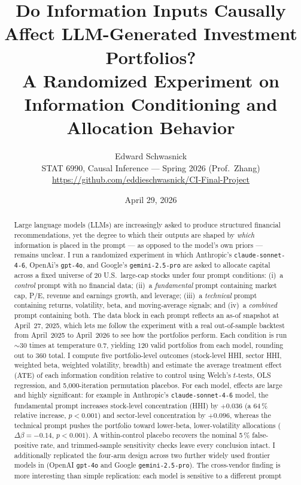 \documentclass[11pt]{article}
\title{\textbf{Do Information Inputs Causally Affect LLM-Generated Investment Portfolios? \\[0.25em]
\large A Randomized Experiment on Information Conditioning and Allocation Behavior}}
\author{Edward Schwasnick \\
\small STAT 6990, Causal Inference --- Spring 2026 (Prof.\ Zhang) \\
\small \url{https://github.com/eddieschwasnick/CI-Final-Project}}
\date{April 29, 2026}
\begin{document}
\maketitle

\begin{abstract}
Large language models (LLMs) are increasingly asked to produce structured
financial recommendations, yet the degree to which their outputs are shaped by
\emph{which} information is placed in the prompt --- as opposed to the
model's own priors --- remains unclear. I run a randomized experiment in which
Anthropic's \texttt{claude-sonnet-4-6}, OpenAi's \texttt{gpt-4o}, and Google's
\texttt{gemini-2.5-pro} are asked to allocate capital across a
fixed universe of 20 U.S.\ large-cap stocks under four prompt conditions:
(i)~a \emph{control} prompt with no financial data; (ii)~a \emph{fundamental}
prompt containing market cap, P/E, revenue and earnings growth, and leverage;
(iii)~a \emph{technical} prompt containing returns, volatility, beta, and
moving-average signals; and (iv)~a \emph{combined} prompt containing both.
The data block in each prompt reflects an as-of snapshot at April~27, 2025,
which lets me follow the experiment with a real out-of-sample backtest from
April~2025 to April~2026 to see how the portfolios perform. Each condition is run $\sim$30 times at temperature
0.7, yielding 120 valid portfolios from each model, rounding out to 360 total. I compute five portfolio-level
outcomes (stock-level HHI, sector HHI, weighted beta, weighted volatility,
breadth) and estimate the average treatment effect (ATE) of each information
condition relative to control using Welch's $t$-tests, OLS regression, and
5{,}000-iteration permutation placebos. For each model, effects are large and highly
significant: for example in Anthropic's \texttt{claude-sonnet-4-6} model, the fundamental prompt increases stock-level concentration (HHI)
by $+0.036$ (a 64\,\% relative increase, $p<0.001$) and sector-level
concentration by $+0.096$, whereas the technical prompt pushes the
portfolio toward lower-beta, lower-volatility allocations ($\Delta\beta
= -0.14$, $p<0.001$). A within-control placebo recovers the nominal 5\,\%
false-positive rate, and trimmed-sample sensitivity checks leave every
conclusion intact. I additionally replicated the four-arm design across two further
widely used frontier models in (OpenAI \texttt{gpt-4o} and Google
\texttt{gemini-2.5-pro}). The cross-vendor finding is more interesting
than simple replication: each model is sensitive to a different prompt

\end{abstract}
\end{document}
